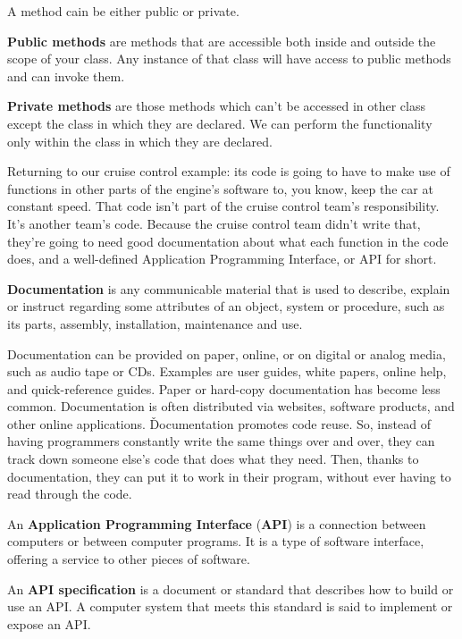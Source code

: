 A method cain be either public or private.

\textbf{Public methods} are methods that are accessible both inside and outside the scope of your class. Any instance
of that class will have access to public methods and can invoke them.
\ed

\textbf{Private methods} are those methods which can't be accessed in other class except the class in which they are
declared. We can perform the functionality only within the class in which they are declared.
\ed

\be
Returning to our cruise control example: its code is going to have to make use of functions in other parts of the
engine's software to, you know, keep the car at constant speed. That code isn't part of the cruise control team's
responsibility. It's another team's code. Because the cruise control team didn't write that, they're going to need
good documentation about what each function in the code does, and a well-defined Application Programming Interface,
or API for short.
\ee

\bd[Documentation]
\textbf{Documentation} is any communicable material that is used to describe, explain or instruct regarding some
attributes of an object, system or procedure, such as its parts, assembly, installation, maintenance and use.
\ed

Documentation can be provided on paper, online, or on digital or analog media, such as audio tape or CDs. Examples
are user guides, white papers, online help, and quick-reference guides. Paper or hard-copy documentation has become
less common. Documentation is often distributed via websites, software products, and other online applications. \v

Documentation promotes code reuse. So, instead of having programmers constantly write the same things over and over,
they can track down someone else's code that does what they need. Then, thanks to documentation, they can put it to
work in their program, without ever having to read through the code.

An \textbf{Application Programming Interface} (\textbf{API}) is a connection between computers or between computer
programs. It is a type of software interface, offering a service to other pieces of software.
\ed

An \textbf{API specification} is a document or standard that describes how to build or use an API. A computer system
that meets this standard is said to implement or expose an API.
\ed

